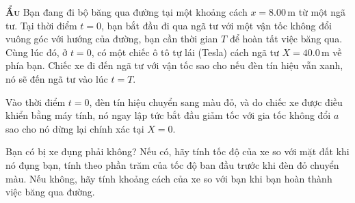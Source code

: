 \begin{problem}

{\textbf{\textsc{Ẩu}}} 
Bạn đang đi bộ băng qua đường tại một khoảng cách \( x = 8.00 \, \text{m} \) từ một ngã tư. Tại thời điểm \( t = 0 \), bạn bắt đầu đi qua ngã tư với một vận tốc không đổi vuông góc với hướng của đường, bạn cần thời gian \( T \) để hoàn tất việc băng qua. Cùng lúc đó, ở \( t = 0 \), có một chiếc ô tô tự lái (Tesla) cách ngã tư \( X = 40.0 \, \text{m} \) về phía bạn. Chiếc xe đi đến ngã tư với vận tốc sao cho nếu đèn tín hiệu vẫn xanh, nó sẽ đến ngã tư vào lúc \( t = T \).

Vào thời điểm \( t = 0 \), đèn tín hiệu chuyển sang màu đỏ, và do chiếc xe được điều khiển bằng máy tính, nó ngay lập tức bắt đầu giảm tốc với gia tốc không đổi \( a \) sao cho nó dừng lại chính xác tại \( X = 0 \).

Bạn có bị xe đụng phải không? Nếu có, hãy tính tốc độ của xe so với mặt đất khi nó đụng bạn, tính theo phần trăm của tốc độ ban đầu trước khi đèn đỏ chuyển màu. Nếu không, hãy tính khoảng cách của xe so với bạn khi bạn hoàn thành việc băng qua đường.

\end{problem}
